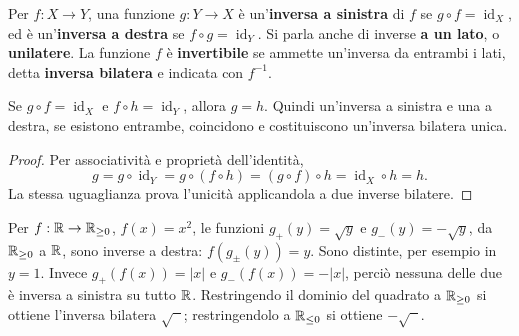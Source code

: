 \begin{definizione}
Per $f:X\to Y$, una funzione $g:Y\to X$ è un'\textbf{inversa a sinistra} di $f$ se $g\circ f=\operatorname{id}_X$, ed è un'\textbf{inversa a destra} se $f\circ g=\operatorname{id}_Y$. Si parla anche di inverse \textbf{a un lato}, o \textbf{unilatere}. La funzione $f$ è \textbf{invertibile} se ammette un'inversa da entrambi i lati, detta \textbf{inversa bilatera} e indicata con $f^{-1}$.
\end{definizione}

\begin{proposizione}
Se $g\circ f=\operatorname{id}_X$ e $f\circ h=\operatorname{id}_Y$, allora $g=h$. Quindi un'inversa a sinistra e una a destra, se esistono entrambe, coincidono e costituiscono un'inversa bilatera unica.
\end{proposizione}
\begin{proof}
Per associatività e proprietà dell'identità,
\[
g=g\circ\operatorname{id}_Y=g\circ(f\circ h)
=(g\circ f)\circ h=\operatorname{id}_X\circ h=h.
\]
La stessa uguaglianza prova l'unicità applicandola a due inverse bilatere.
\end{proof}

\begin{esempio}
Per $f:\mathbb{R}\to\mathbb{R}_{\ge0}$, $f(x)=x^2$, le funzioni $g_+(y)=\sqrt y$ e $g_-(y)=-\sqrt y$, da $\mathbb{R}_{\ge0}$ a $\mathbb{R}$, sono inverse a destra: $f(g_\pm(y))=y$. Sono distinte, per esempio in $y=1$. Invece $g_+(f(x))=|x|$ e $g_-(f(x))=-|x|$, perciò nessuna delle due è inversa a sinistra su tutto $\mathbb{R}$. Restringendo il dominio del quadrato a $\mathbb{R}_{\ge0}$ si ottiene l'inversa bilatera $\sqrt{\phantom{x}}$; restringendolo a $\mathbb{R}_{\le0}$ si ottiene $-\sqrt{\phantom{x}}$.
\end{esempio}

